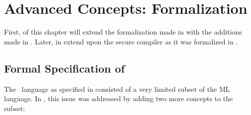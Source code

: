 \chapter{Advanced Concepts: Formalization}

First,  of this chapter will extend the formalization made in  with the additions made in .
Later, in  extend upon the secure compiler as it was formalized in .

\section{Formal Specification of \MiniML}
\label{sec:formalspec2}
The \MiniML\ language as specified in  consisted of a very limited subset of the ML language.
In , this issue was addressed by adding two more concepts to the subset:
